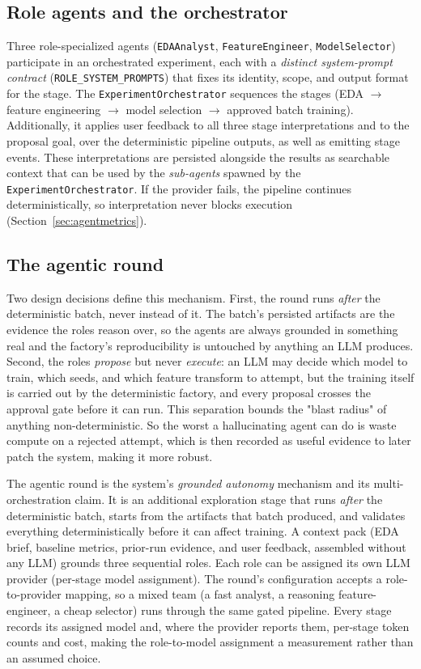 \subsection{Role agents and the orchestrator}

Three role-specialized agents (\texttt{EDAAnalyst}, \texttt{FeatureEngineer}, \texttt{ModelSelector}) participate in an orchestrated experiment, each with a \emph{distinct system-prompt contract} (\texttt{ROLE\_SYSTEM\_PROMPTS}) that fixes its identity, scope, and output format for the stage. The \texttt{ExperimentOrchestrator} sequences the stages (EDA $\rightarrow$ feature engineering $\rightarrow$ model selection $\rightarrow$ approved batch training). Additionally, it applies user feedback to all three stage interpretations and to the proposal goal, over the deterministic pipeline outputs, as well as emitting stage events. These interpretations are persisted alongside the results as searchable context that can be used by the \emph{sub-agents} spawned by the \texttt{ExperimentOrchestrator}. If the provider fails, the pipeline continues deterministically, so interpretation never blocks execution (Section~\ref{sec:agentmetrics}).

\subsection{The agentic round}
\label{sec:agenticround}

Two design decisions define this mechanism. First, the round runs \emph{after} the deterministic batch, never instead of it. The batch's persisted artifacts are the evidence the roles reason over, so the agents are always grounded in something real and the factory's reproducibility is untouched by anything an LLM produces. Second, the roles \emph{propose} but never \emph{execute}: an LLM may decide which model to train, which seeds, and which feature transform to attempt, but the training itself is carried out by the deterministic factory, and every proposal crosses the approval gate before it can run. This separation bounds the "blast radius" of anything non-deterministic. So the worst a hallucinating agent can do is waste compute on a rejected attempt, which is then recorded as useful evidence to later patch the system, making it more robust.

The agentic round is the system's \emph{grounded autonomy} mechanism and its multi-orchestration claim. It is an additional exploration stage that runs \emph{after} the deterministic batch, starts from the artifacts that batch produced, and validates everything deterministically before it can affect training. A context pack (EDA brief, baseline metrics, prior-run evidence, and user feedback, assembled without any LLM) grounds three sequential roles. Each role can be assigned its own LLM provider (per-stage model assignment). The round's configuration accepts a role-to-provider mapping, so a mixed team (a fast analyst, a reasoning feature-engineer, a cheap selector) runs through the same gated pipeline. Every stage records its assigned model and, where the provider reports them, per-stage token counts and cost, making the role-to-model assignment a measurement rather than an assumed choice.

